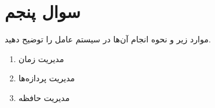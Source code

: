 \section{سوال پنجم}


موارد زیر و نحوه انجام آن‌ها در سیستم عامل را توضیح دهید.
\begin{enumerate}
	\item 
	مدیریت زمان
	\begin{qsolve}
		
	\end{qsolve}
	
	
	\item 
	مدیریت پردازه‌ها
	\begin{qsolve}
		
	\end{qsolve}
	
	
	\item 
	مدیریت حافظه
	\begin{qsolve}
		
	\end{qsolve}
	
	
\end{enumerate}






